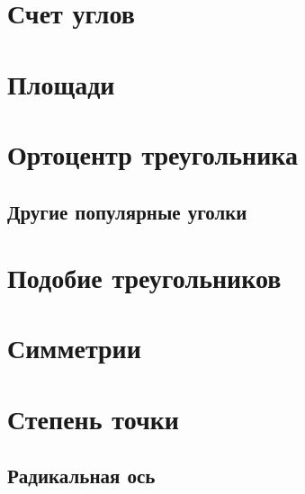 \documentclass[twoside]{article}
\begin{document}
\pagestyle{empty}

% 


\newpage

\tableofcontents
\newpage

\setcounter{page}{1}
\pagestyle{fancy}


\section{Счет углов}


% 

\section{Площади}


\section{Ортоцентр треугольника}


\subsection{Другие популярные уголки}



\section{Подобие треугольников}


\section{Симметрии}

\section{Степень точки}


\subsection{Радикальная ось}

\end{document}

